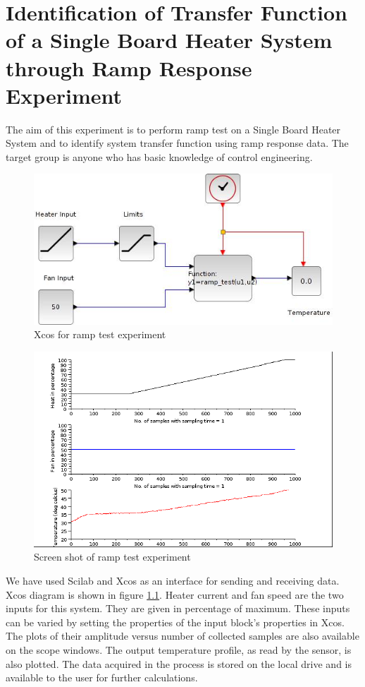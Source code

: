 \chapter{Identification of Transfer Function of a Single Board Heater System through Ramp Response Experiment}\label{chap2}
The aim of this experiment is to perform ramp test on a Single Board Heater System and to identify system transfer 
function using ramp response data. The target group is anyone who has basic knowledge of control engineering.

\begin{figure}
\centering
\includegraphics[width=0.7\linewidth]{Ramp-test_manual/ramp_test.jpg}
\caption{Xcos for ramp test experiment}
\label{Xcos_rt}
\end{figure} 

\begin{figure}
\centering
\includegraphics[width=\linewidth]{Ramp-test_manual/ramp-test.png}
\caption{Screen shot of ramp test experiment}
\end{figure}

We have used Scilab and Xcos as an interface for sending and receiving data. 
Xcos diagram is shown in figure \ref{Xcos_rt}. Heater current and fan speed are the two inputs for this system. 
They are given in percentage of maximum. These inputs can be varied by setting the properties of the input block's properties 
in Xcos. The plots of their amplitude versus number of collected samples are also available on the scope windows. 
The output temperature profile, as read by the sensor, is also plotted. The data acquired in the process is stored on the 
local drive and is available to the user for further calculations.

